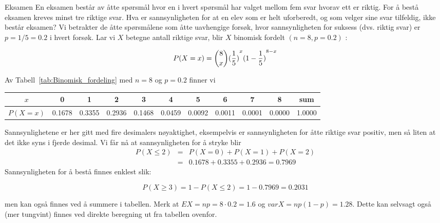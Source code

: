 \begin{eksempel}{Eksamen}
En eksamen består av åtte spørsmål hvor en i hvert spørsmål har
valget mellom fem svar hvorav ett er riktig. For å bestå eksamen
kreves minst tre riktige svar. Hva er sannsynligheten for at en
elev som er helt uforberedt, og som velger sine svar tilfeldig,
ikke består eksamen? Vi betrakter de åtte spørsmålene som 
åtte uavhengige forsøk, hvor sannsynligheten for suksess (dvs. riktig
svar) er $p=1/5=0.2$ i hvert forsøk. Lar vi $X$ betegne antall
riktige svar, blir $X$ binomisk fordelt $(n=8, p=0.2)$ :
                                                   
\[ P(X=x)={{8}\choose{x}}{(\frac{1}{5})}^x{(1-\frac{1}{5})}^{8-x} \]

	\noindent Av Tabell~\ref{tab:Binomisk_fordeling} med $n=8$ og $p=0.2$ finner vi
\begin{center} \scriptsize \addtolength{\tabcolsep}{-0.5\tabcolsep}
\begin{tabular}{c|ccccccccc|c}
    $x$& 0 & 1 & 2 & 3 & 4 & 5 & 6 & 7 & 8 & sum \\ \hline
 $P(X=x)$&0.1678&0.3355&0.2936&0.1468&0.0459&0.0092&0.0011&0.0001&0.0000&1.0000
\end{tabular}
\end{center}
\noindent Sannsynlighetene er her gitt med fire desimalers nøyaktighet,
eksempelvis er sannsynligheten for åtte riktige svar positiv, men
så liten at det ikke syns i fjerde desimal. Vi får nå at
sannsynligheten for å stryke blir
\begin{eqnarray*}
P(X\leq 2)&=&P(X=0)+P(X=1)+P(X=2) \\
          &=&0.1678+0.3355+0.2936=0.7969
\end{eqnarray*}
Sannsynligheten for å bestå finnes enklest slik:

\[ P(X\geq 3)=1-P(X\leq 2)=1-0.7969=0.2031 \]

\noindent men kan også finnes ved å summere i tabellen.
Merk at $EX=np=8\cdot 0.2=1.6$ og $var X=np(1-p)=1.28$. Dette kan
selvsagt også (mer tungvint) finnes ved direkte beregning ut fra
tabellen ovenfor.
\end{eksempel}

